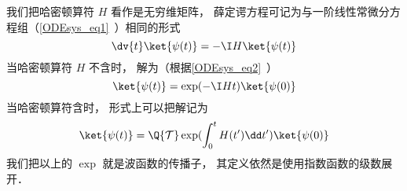 我们把哈密顿算符 $H$ 看作是无穷维矩阵， 薛定谔方程可记为与一阶线性常微分方程组（\autoref{ODEsys_eq1}~）相同的形式
\begin{equation}
\dv{t} \ket{\psi(t)} = -\I H \ket{\psi(t)}
\end{equation}
当哈密顿算符 $H$ 不含时， 解为（根据\autoref{ODEsys_eq2}~）
\begin{equation}
\ket{\psi(t)} = \exp(-\I H t) \ket{\psi(0)}
\end{equation}
当哈密顿算符含时， 形式上可以把解记为
\begin{equation}
\ket{\psi(t)} = \Q {\mathcal T} \exp(\int_0^ t H(t')\dd t') \ket{\psi(0)}
\end{equation}
我们把以上的 $\exp$ 就是波函数的传播子， 其定义依然是使用指数函数的级数展开．
